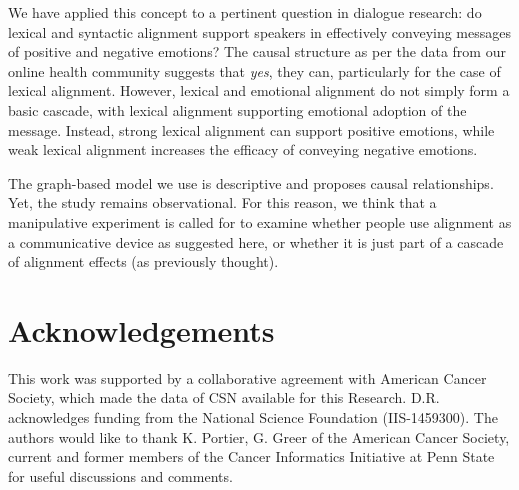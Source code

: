 We have applied this concept to a pertinent question in dialogue research: do lexical and syntactic alignment support speakers in effectively conveying messages of positive and negative emotions?  The causal structure as per the data from our online health community suggests that \emph{yes}, they can, particularly for the case of lexical alignment.  However, lexical and emotional alignment do not simply form a basic cascade, with lexical alignment supporting emotional adoption of the message.  Instead, strong lexical alignment can support positive emotions, while weak lexical alignment increases the efficacy of conveying negative emotions.

The graph-based model we use is descriptive and proposes causal relationships.  Yet, the study remains observational.  For this reason, we think that a manipulative experiment is called for to examine whether people use alignment as a communicative device as suggested here, or whether it is just part of a cascade of alignment effects (as previously thought).






\section*{Acknowledgements}
This work was supported by a collaborative agreement with
American Cancer Society, which made the data of CSN available for this Research. D.R. acknowledges funding from the National Science Foundation (IIS-1459300). The authors would like to thank K. Portier, G. Greer of the
American Cancer Society, current and former members of the Cancer
Informatics Initiative at Penn State for useful discussions and comments.



\printbibliography
